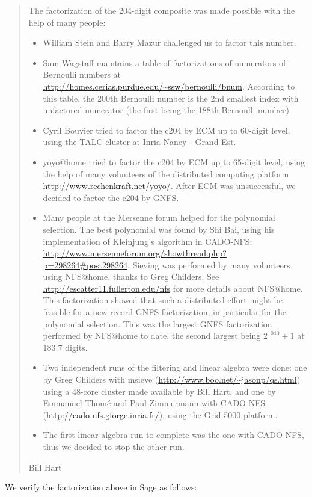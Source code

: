 \documentclass[openany]{book}
\theoremstyle{plain}
\theoremstyle{definition}
\begin{document}
{\begin{quote}
The factorization of the 204-digit composite was made possible with the help
of many people:
\begin{itemize}
\item William Stein and Barry Mazur challenged us to factor this number.
\item Sam Wagstaff maintains a table of factorizations of numerators of Bernoulli
  numbers at \url{http://homes.cerias.purdue.edu/~ssw/bernoulli/bnum}. According
  to this table, the 200th Bernoulli number is the 2nd smallest index with
  unfactored numerator (the first being the 188th Bernoulli number).
\item Cyril Bouvier tried to factor the c204 by ECM up to 60-digit level, using
  the TALC cluster at Inria Nancy - Grand Est.
\item {\sf yoyo@home} tried to factor the c204 by ECM up to 65-digit level, using the
  help of many volunteers of the distributed computing platform
  \url{http://www.rechenkraft.net/yoyo/}.
 After ECM was unsuccessful, we decided to factor the c204 by GNFS.
\item Many people at the Mersenne forum helped for the polynomial selection. The best
  polynomial was found by Shi Bai, using his implementation of Kleinjung's
  algorithm in CADO-NFS:
  \url{http://www.mersenneforum.org/showthread.php?p=298264#post298264}.
 Sieving was performed by many volunteers using {\sf NFS@home}, thanks to Greg
  Childers. See \url{http://escatter11.fullerton.edu/nfs} for more details
  about {\sf NFS@home}.
  This factorization showed that such a distributed effort might be feasible for a
  new record GNFS factorization, in particular for the polynomial selection.
  This was the largest GNFS factorization performed by {\sf NFS@home} to date,
  the second largest being $2^{1040}+1$ at 183.7 digits.
\item Two independent runs of the filtering and linear algebra were done: one by Greg
  Childers with msieve (\url{http://www.boo.net/~jasonp/qs.html}) using a 48-core
  cluster made available by Bill Hart, and one by Emmanuel Thom\'{e} and Paul
  Zimmermann with CADO-NFS (\url{http://cado-nfs.gforge.inria.fr/}), using the Grid
  5000 platform.
\item The first linear algebra run to complete was the one with CADO-NFS, thus we
  decided to stop the other run.
\end{itemize}

Bill Hart
\end{quote}

We verify the factorization above in Sage as follows: \\

}
\end{document}

